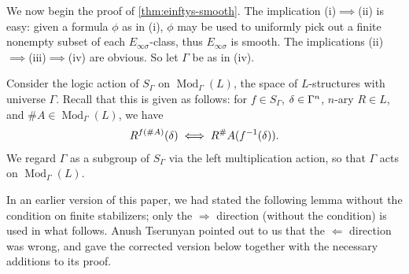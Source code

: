 \documentclass[11pt]{article}
\DeclareMathOperator\Mod{Mod}
\begin{document}
We now begin the proof of \cref{thm:einftys-smooth}.  The implication (i)$\implies$(ii) is easy: given a formula $\phi$ as in (i), $\phi$ may be used to uniformly pick out a finite nonempty subset of each $E_{\infty\sigma}$-class, thus $E_{\infty\sigma}$ is smooth.  The implications (ii)$\implies$(iii)$\implies$(iv) are obvious.  So let $\Gamma$ be as in (iv).

Consider the logic action of $S_\Gamma$ on $\Mod_\Gamma(L)$, the space of $L$-structures with universe $\Gamma$.  Recall that this is given as follows: for $f \in S_\Gamma$, $\-\delta \in \Gamma^n$, $n$-ary $R \in L$, and $\#A \in \Mod_\Gamma(L)$, we have
\begin{align*}
R^{f(\#A)}(\-\delta) \iff R^\#A(f^{-1}(\-\delta)).
\end{align*}
We regard $\Gamma$ as a subgroup of $S_\Gamma$ via the left multiplication action, so that $\Gamma$ acts on $\Mod_\Gamma(L)$.

In an earlier version of this paper, we had stated the following lemma without the condition on finite stabilizers; only the $\Longrightarrow$ direction (without the condition) is used in what follows.  Anush Tserunyan pointed out to us that the $\Longleftarrow$ direction was wrong, and gave the corrected version below together with the necessary additions to its proof.
\end{document}
